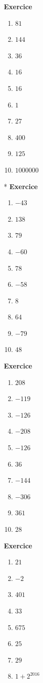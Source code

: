 \documentclass[10pt,a4paper]{article}
\newcounter{nexo}
\begin{document}
\textbf{Exercice \thenexo} 
\begin{multicols}{5}
	\begin{enumerate}[label=\alph*)]
		\item $81$
		\item $144$
		\item $36$
		\item $16$
		\item $16$
		\item $1$
		\item $27$
		\item $400$
		\item $125$
		\item $1 000 000$
	\end{enumerate}
\end{multicols}
*%
\textbf{Exercice \thenexo} 
\begin{multicols}{5}
	\begin{enumerate}[label=\alph*)]
		\item $-43$
		\item $138$
		\item $79$
		\item $-60$
		\item $78$
		\item $-58$
		\item $8$
		\item $64$
		\item $-79$
		\item $48$ 
	\end{enumerate}
\end{multicols}
\textbf{Exercice \thenexo} 
\begin{multicols}{5}
	\begin{enumerate}[label=\alph*)]
		\item $208$
		\item $-119$
		\item $-126$
		\item $-208$
		\item $-126$
		\item $36$
		\item $-144$
		\item $-306$
		\item $361$
		\item $28$
	\end{enumerate}
\end{multicols}
\textbf{Exercice \thenexo} 
\begin{multicols}{5}
	\begin{enumerate}[label=\alph*)]
		\item $21$
		\item $-2$
		\item $401$
		\item $33$
		\item $675$
		\item $25$
		\item $29$
		\item $1+2^{2016}$
	\end{enumerate}
\end{multicols}
\end{document}
